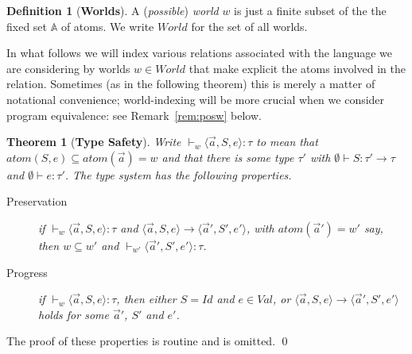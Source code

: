\documentclass{LMCS}
\theoremstyle{plain}
\newtheorem{theorem}[thm]{Theorem}
\theoremstyle{definition}
\newtheorem{definition}[thm]{Definition}
\newcommand{\Atom}{\mathbb{A}}
\newcommand{\atoms}{\mathit{atom}}
\newcommand{\config}[3]{\langle#1, #2, #3\rangle}
\newcommand{\ent}{\vdash}
\newcommand{\enty}{\vdash}
\newcommand{\es}{\mathit{Id}}
\renewcommand{\exp}[1][e]{#1}
\newcommand{\FUNTY}{\mathbin{\rightarrow}}
\newcommand{\ofty}{:}
\newcommand{\s}[1][a]{\vec{#1}}
\newcommand{\stk}[1][S]{#1}
\newcommand{\trans}{\longrightarrow}
\newcommand{\ty}{\tau}
\newcommand{\Val}{\mathit{Val}}
\newcommand{\w}[1][w]{#1}
\newcommand{\World}{\mathit{World}}
\begin{document}
\begin{definition}[\textbf{Worlds}]
  A (\emph{possible}) \emph{world} $\w$ is just a finite subset of the
  the fixed set $\Atom$ of atoms. We write $\World$ for the set of all
  worlds.  
\end{definition}
In what follows we will index various relations associated with the
language we are considering by worlds $\w\in\World$ that make explicit
the atoms involved in the relation. Sometimes (as in the following
theorem) this is merely a matter of notational convenience;
world-indexing will be more crucial when we consider program
equivalence: see Remark~\ref{rem:posw} below.

\begin{theorem}[\textbf{Type Safety}]
  \label{thm:typs}
  Write ${}\ent_{\w}\config{\s}{\stk}{\exp}\ofty\ty$ to mean that
  $\atoms(\stk,\exp)\subseteq\atoms(\s) = \w$ and that there is some
  type $\ty'$ with $\emptyset\enty \stk\ofty\ty'\FUNTY\ty$ and
  $\emptyset\enty \exp\ofty\ty'$. The type system has the
  following properties.
  \begin{description}
  \item[Preservation] if ${}\ent_{\w}\config{\s}{\stk}{\exp}\ofty\ty$
    and $\config{\s}{\stk}{\exp}\trans \config{\s'}{\stk'}{\exp'}$,
    with $\atoms(\s')=\w'$ say, then $\w\subseteq\w'$ and
    ${}\ent_{\w'} \config{\s'}{\stk'}{\exp'}\ofty\ty$.
    
  \item[Progress] if ${}\ent_{\w}\config{\s}{\stk}{\exp}\ofty\ty$,
    then either $\stk=\es$ and $\exp\in\Val$, or
    $\config{\s}{\stk}{\exp}\trans \config{\s'}{\stk'}{\exp'}$ holds
    for some $\s'$, $\stk'$ and $\exp'$.
  \end{description}
\end{theorem}
\proof
  The proof of these properties is routine and is omitted.
\qed
\end{document}
